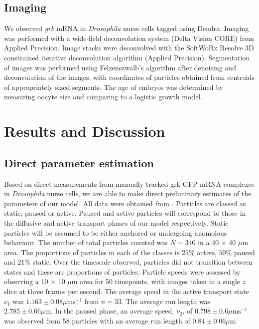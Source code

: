 \documentclass[twocolumn]{biophys}
\begin{document}
\subsection{Imaging}
We observed \textit{grk} mRNA in \textit{Drosophila} nurse cells tagged using Dendra. 
Imaging was performed with a wide-field deconvolution system (Delta Vision CORE) from Applied Precision. 
Image stacks were deconvolved with the SoftWoRx Resolve 3D constrained iterative deconvolution algorithm (Applied Precision). 
Segmentation of images was performed using Felzenszwalb's algorithm \citep{felzenszwalb2004efficient} after denoising and deconvolution of the images, with coordinates of particles obtained from centroids of appropriately sized segments. 
The age of embryos was determined by measuring oocyte size and comparing to a logistic growth model.

\section{Results and Discussion} \label{Results}

\subsection{Direct parameter estimation}
Based on direct measurements from manually tracked grk-GFP mRNA complexes in \textit{Drosophila} nurse cells, we are able to make direct preliminary estimates of the parameters of our model.
All data were obtained from \citet{DavidsonPhD2015}.
Particles are classed as static, paused or active.
Paused and active particles will correspond to those in the diffusive and active transport phases of our model respectively. 
Static particles will be assumed to be either anchored or undergoing anomolous behaviour. 
The number of total particles counted was $N=340$ in a 40 $\times$ 40 $\mu \text{m}$ area.
The proportions of particles in each of the classes is $25\%$ active, $50\%$ paused and $21\%$ static. 
Over the timescale observed, particles did not transition between states and these are proportions of particles. 
Particle speeds were assessed by observing a 10 $\times$ 10 $\mu \text{m}$ area for 50 timepoints, with images taken in a single $z$ slice at three frames per second. 
The average speed in the active transport state $\nu_1 $ was  $1.163 \pm 0.08 \mu \text{ms}^{-1}$ from $n=33$. 
The average run length was $2.785 \pm 0.66 \mu \text{m}$. 
In the paused phase, an average speed, $\nu_2$, of $0.798 \pm 0.6 \mu \text{ms}^{-1}$ was observed from 58 particles with an average run length of  $0.84 \pm 0.06 \mu \text{m}$. 
\end{document}
